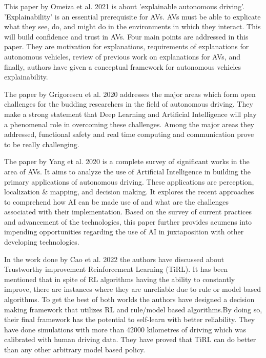 This paper by Omeiza et al. 2021 \cite{omeiza2021explanations} is about 'explainable autonomous driving'. 'Explainability' is an essential 
prerequisite for AVs. AVs must be able to explicate what they see, do, and might do in the environments in which they interact. This will build confidence and trust in AVs. Four main points are addressed in this paper. They are motivation for explanations, requirements of explanations for autonomous vehicles, review of previous work on explanations for AVs, and finally, authors have given a conceptual framework for autonomous vehicles explainability.

The paper by Grigorescu et al. 2020 \cite{grigorescu2020survey} addresses the major areas which form open challenges for the budding researchers in the field of autonomous driving. They make a strong statement that Deep Learning and Artificial Intelligence will play a phenomenal role in overcoming these challenges. Among the major areas they addressed, functional safety and real time computing and communication prove to be really challenging.

The paper by Yang et al. 2020 \cite{ma2020artificial} is a complete survey of significant works in the area of AVs. It aims to analyze the use of Artificial Intelligence in building the primary applications of autonomous driving. These applications are perception, localization \& mapping, and decision making. It explores the recent approaches to comprehend how AI can be made use of and what are the challenges associated with their implementation. Based on the survey of current practices and advancement of the technologies, this paper further provides acumens into impending opportunities regarding the use of AI in juxtaposition with other developing technologies.


In the work done by Cao et al. 2022 \cite{cao2022trustworthy} the authors have discussed about Trustworthy improvement Reinforcement Learning (TiRL). It has been mentioned that in spite of RL algorithms having the ability to constantly improve, there are instances where they are unreliable due to rule or model based algorithms. To get the best of both worlds the authors have designed a decision making framework that utilizes RL and rule/model based algorithms.By doing so, their final framework has the potential to self-learn with better reliability. They have done simulations with more than 42000 kilometres of driving which was calibrated with human driving data. They have proved that TiRL can do better than any other arbitrary model based policy. 

